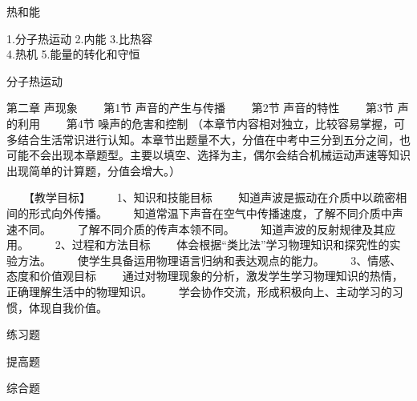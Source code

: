\documentclass[12pt]{exam}
\newcommand{\keti}{热和能}
\newcommand{\zhongdian}{1.分子热运动 2.内能 3.比热容\\  4.热机 5.能量的转化和守恒}
\renewcommand{\section}[1]{{\large\sffamily  #1} \par}
\begin{document}
\vspace*{80pt}
\keti \par
\zhongdian \par
\section{分子热运动}
第二章  声现象
　　第1节  声音的产生与传播                 
　　第2节  声音的特性                       
　　第3节  声的利用                         
　　第4节  噪声的危害和控制                
（本章节内容相对独立，比较容易掌握，可多结合生活常识进行认知。本章节出题量不大，分值在中考中三分到五分之间，也可能不会出现本章题型。主要以填空、选择为主，偶尔会结合机械运动声速等知识出现简单的计算题，分值会增大。）


　　【教学目标】
　　1、知识和技能目标  
　　知道声波是振动在介质中以疏密相间的形式向外传播。
　　知道常温下声音在空气中传播速度，了解不同介质中声速不同。
　　了解不同介质的传声本领不同。
　　知道声波的反射规律及其应用。
　　2、过程和方法目标 
　　体会根据“类比法”学习物理知识和探究性的实验方法。
　　使学生具备运用物理语言归纳和表达观点的能力。
　　3、情感、态度和价值观目标  
　　通过对物理现象的分析，激发学生学习物理知识的热情，正确理解生活中的物理知识。
　　学会协作交流，形成积极向上、主动学习的习惯，体现自我价值。




\section{练习题}














\begin{improveexercises}
\section{提高题}

\end{improveexercises}

\begin{advanceexercises}
\section{综合题}

\end{advanceexercises}

\end{document}
